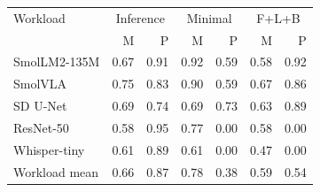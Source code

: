 \begin{tabular}{lrrrrrr}
\toprule
Workload & \multicolumn{2}{c}{Inference} & \multicolumn{2}{c}{Minimal} & \multicolumn{2}{c}{F+L+B} \\ & M & P & M & P & M & P \\
\midrule
SmolLM2-135M & 0.67 & 0.91 & 0.92 & 0.59 & 0.58 & 0.92 \\
SmolVLA & 0.75 & 0.83 & 0.90 & 0.59 & 0.67 & 0.86 \\
SD U-Net & 0.69 & 0.74 & 0.69 & 0.73 & 0.63 & 0.89 \\
ResNet-50 & 0.58 & 0.95 & 0.77 & 0.00 & 0.58 & 0.00 \\
Whisper-tiny & 0.61 & 0.89 & 0.61 & 0.00 & 0.47 & 0.00 \\
Workload mean & 0.66 & 0.87 & 0.78 & 0.38 & 0.59 & 0.54 \\
\bottomrule
\end{tabular}
